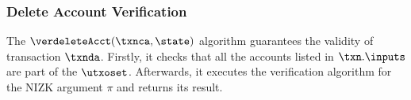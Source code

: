 \subsubsection{Delete Account Verification}

The $\verdeleteAcct(\txnca, \state)$ algorithm guarantees the validity of transaction $\txnda$.
Firstly, it checks that all the accounts listed in $\txn.\inputs$ are part of the $\utxoset$. Afterwards, it executes the verification algorithm for the NIZK argument $\pi$ and returns its result.